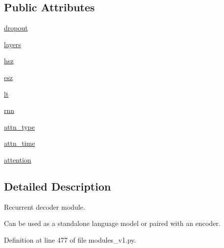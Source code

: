 \subsection*{Public Attributes}
\begin{DoxyCompactItemize}
\item 
\hyperlink{classparlai_1_1agents_1_1legacy__agents_1_1seq2seq_1_1modules__v1_1_1RNNDecoder_aafa9ff93604c33107620e2286d31bc81}{dropout}
\item 
\hyperlink{classparlai_1_1agents_1_1legacy__agents_1_1seq2seq_1_1modules__v1_1_1RNNDecoder_ae07b00d6b87da72582999538b279d57c}{layers}
\item 
\hyperlink{classparlai_1_1agents_1_1legacy__agents_1_1seq2seq_1_1modules__v1_1_1RNNDecoder_aab11ebf05dd6029a3db64b8170c552c7}{hsz}
\item 
\hyperlink{classparlai_1_1agents_1_1legacy__agents_1_1seq2seq_1_1modules__v1_1_1RNNDecoder_a6a0beb3ff226d0757b023acd8189366f}{esz}
\item 
\hyperlink{classparlai_1_1agents_1_1legacy__agents_1_1seq2seq_1_1modules__v1_1_1RNNDecoder_a6780484ed7624987b046a01952e48b4a}{lt}
\item 
\hyperlink{classparlai_1_1agents_1_1legacy__agents_1_1seq2seq_1_1modules__v1_1_1RNNDecoder_adc1ecb61f30e70d211f0d53adb399fd6}{rnn}
\item 
\hyperlink{classparlai_1_1agents_1_1legacy__agents_1_1seq2seq_1_1modules__v1_1_1RNNDecoder_acbbf1a67ceb9dc480faabf0db0fadb3d}{attn\+\_\+type}
\item 
\hyperlink{classparlai_1_1agents_1_1legacy__agents_1_1seq2seq_1_1modules__v1_1_1RNNDecoder_a596b3a31dc03cd19485d86ad7be90981}{attn\+\_\+time}
\item 
\hyperlink{classparlai_1_1agents_1_1legacy__agents_1_1seq2seq_1_1modules__v1_1_1RNNDecoder_a03c0b43494c2b18f4f6dcb04e14de8e1}{attention}
\end{DoxyCompactItemize}


\subsection{Detailed Description}
\begin{DoxyVerb}Recurrent decoder module.

Can be used as a standalone language model or paired with an encoder.
\end{DoxyVerb}
 

Definition at line 477 of file modules\+\_\+v1.\+py.



